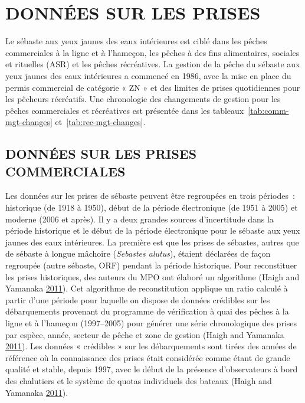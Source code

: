 \documentclass[11pt]{book}
\begin{document}
\frontmatter

\section{DONNÉES SUR LES PRISES}
\label{app:catch-data}

Le sébaste aux yeux jaunes des eaux intérieures est ciblé dans les pêches commerciales à la ligne et à l'hameçon, les pêches à des fins alimentaires, sociales et rituelles (ASR) et les pêches récréatives. La gestion de la pêche du sébaste aux yeux jaunes des eaux intérieures a commencé en 1986, avec la mise en place du permis commercial de catégorie « ZN » et des limites de prises quotidiennes pour les pêcheurs récréatifs. Une chronologie des changements de gestion pour les pêches commerciales et récréatives est présentée dans les tableaux~\ref{tab:comm-mgt-changes} et~\ref{tab:rec-mgt-changes}.

\hypertarget{sec:com-catch-data}{%
\subsection{DONNÉES SUR LES PRISES COMMERCIALES}\label{sec:com-catch-data}}

Les données sur les prises de sébaste peuvent être regroupées en trois périodes~: historique (de 1918 à 1950), début de la période électronique (de 1951 à 2005) et moderne (2006 et après). Il y a deux grandes sources d'incertitude dans la période historique et le début de la période électronique pour le sébaste aux yeux jaunes des eaux intérieures. La première est que les prises de sébastes, autres que de sébaste à longue mâchoire (\emph{Sebastes alutus}), étaient déclarées de façon regroupée (autre sébaste, ORF) pendant la période historique. Pour reconstituer les prises historiques, des auteurs du MPO ont élaboré un algorithme (Haigh and Yamanaka \protect\hyperlink{ref-haigh2011}{2011}). Cet algorithme de reconstitution applique un ratio calculé à partir d'une période pour laquelle on dispose de données crédibles sur les débarquements provenant du programme de vérification à quai des pêches à la ligne et à l'hameçon (1997--2005) pour générer une série chronologique des prises par espèce, année, secteur de pêche et zone de gestion (Haigh and Yamanaka \protect\hyperlink{ref-haigh2011}{2011}). Les données « crédibles » sur les débarquements sont tirées des années de référence où la connaissance des prises était considérée comme étant de grande qualité et stable, depuis 1997, avec le début de la présence d'observateurs à bord des chalutiers et le système de quotas individuels des bateaux (Haigh and Yamanaka \protect\hyperlink{ref-haigh2011}{2011}).
\end{document}
